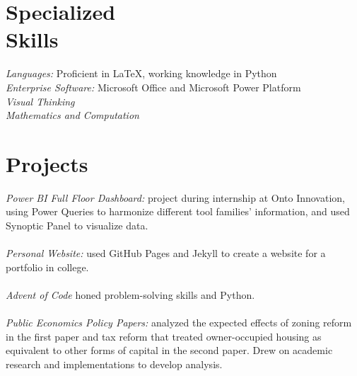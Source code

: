 \documentclass[margin, 12pt]{res} %
\begin{document}
\begin{resume}

\section{\sc Specialized \\ Skills} 

{\sl Languages:} Proficient in \LaTeX, working knowledge in Python\\
{\sl Enterprise Software:} Microsoft Office and Microsoft Power Platform\\
{\sl Visual Thinking}\\
{\sl Mathematics and Computation}

\section{\sc Projects}
{\sl Power BI Full Floor Dashboard:} project during internship at Onto Innovation, using Power Queries to harmonize different tool families' information, and used Synoptic Panel to visualize data.\\
\vspace{4pt}\\
{\sl Personal Website:} used GitHub Pages and Jekyll to create a website for a portfolio in college.\\
\vspace{4pt}\\
{\sl Advent of Code} honed problem-solving skills and Python.\\
\vspace{4pt}\\
{\sl Public Economics Policy Papers:} analyzed the expected effects of zoning reform in the first paper and tax reform that treated owner-occupied housing as equivalent to other forms of capital in the second paper. Drew on academic research and implementations to develop analysis.\\
\vspace{4pt}\\

\end{resume}
\end{document}
